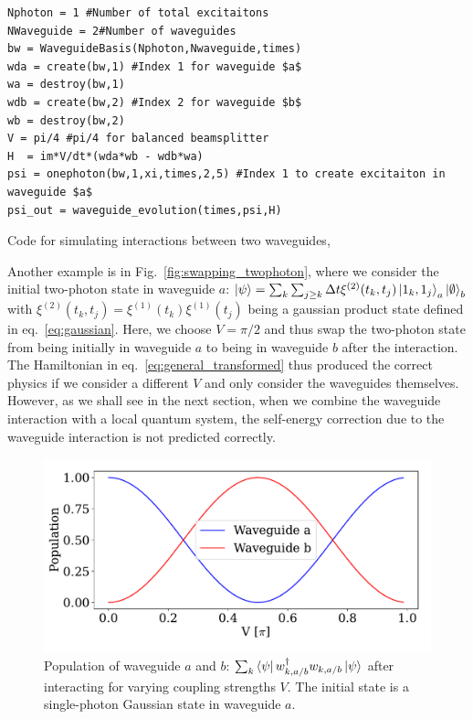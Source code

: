 \begin{listing}[H]
\begin{verbatim}
Nphoton = 1 #Number of total excitaitons
NWaveguide = 2#Number of waveguides
bw = WaveguideBasis(Nphoton,Nwaveguide,times)
wda = create(bw,1) #Index 1 for waveguide $a$
wa = destroy(bw,1)
wdb = create(bw,2) #Index 2 for waveguide $b$
wb = destroy(bw,2)
V = pi/4 #pi/4 for balanced beamsplitter
H  = im*V/dt*(wda*wb - wdb*wa)
psi = onephoton(bw,1,xi,times,2,5) #Index 1 to create excitaiton in waveguide $a$
psi_out = waveguide_evolution(times,psi,H) 
\end{verbatim}
\caption{Code for simulating interactions between two waveguides,}
\label{ls:beamsplitter_code}
\end{listing}

Another example is in Fig.~\ref{fig:swapping_twophoton}, where we consider the initial two-photon state in waveguide $a$: $\ket{\psi} = \sum_k \sum_{j \geq k} \Delta t \xi^{(2)}(t_k,t_j) \ket{1_k,1_j}_a\ket{\emptyset}_b$ with $\xi^{(2)}(t_k,t_j) = \xi^{(1)}(t_k)\xi^{(1)}(t_j)$ being a gaussian product state defined in eq.~\eqref{eq:gaussian}. Here, we choose $V=\pi/2$ and thus swap the two-photon state from being initially in waveguide $a$ to being in waveguide $b$ after the interaction. The Hamiltonian in eq.~\eqref{eq:general_transformed} thus produced the correct physics if we consider a different $V$ and only consider the waveguides themselves. However, as we shall see in the next section, when we combine the waveguide interaction with a local quantum system, the self-energy correction due to the waveguide interaction is not predicted correctly. 


\begin{figure}
    \centering
    \includegraphics[width=0.6 \linewidth]{figures/beamsplitter_trans.pdf}
    \caption{Population of waveguide $a$ and $b$: $\sum_k \bra{\psi} w_{k,a/b}^\dagger w_{k,a/b} \ket{\psi}$ after interacting for varying coupling strengths $V$. The initial state is a single-photon Gaussian state in waveguide $a$.}
    \label{fig:beamsplitter_trans}
\end{figure}


